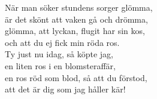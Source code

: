 \vspace{10pt}
När man söker stundens sorger glömma,\\
är det skönt att vaken gå och drömma,\\
glömma, att lyckan, flugit har sin kos,\\
och att du ej fick min röda ros.\\
Ty just nu idag, så köpte jag,\\
en liten ros i en blomsteraffär,\\
en ros röd som blod, så att du förstod,\\
att det är dig som jag håller kär!
